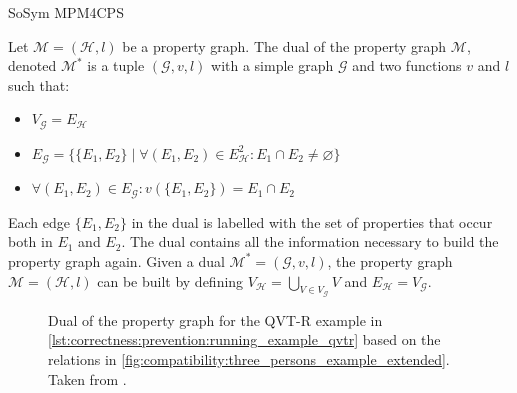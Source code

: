 \begin{copiedFrom}{SoSym MPM4CPS}
\begin{definition}
Let $\mathcal{M} = (\mathcal{H}, l)$ be a property graph. The dual of the property graph $\mathcal{M}$, denoted $\mathcal{M^{*}}$ is a tuple $(\mathcal{G}, v, l)$ with a simple graph $\mathcal{G}$ and two functions $v$ and $l$ such that:
    \begin{itemize}
        \item $V_{\mathcal{G}} = E_{\mathcal{H}}$
        \item $E_{\mathcal{G}} = \{\{E_1, E_2\} \mid \forall (E_1, E_2) \in E_{\mathcal{H}}^2 : E_1 \cap E_2 \neq \varnothing\}$
        \item $\forall (E_1, E_2) \in E_{\mathcal{G}} : v(\{E_1, E_2\}) = E_1 \cap E_2$
    \end{itemize}
\end{definition}

Each edge $\{E_1, E_2\}$ in the dual is labelled with the set of properties that occur both in $E_1$ and $E_2$. The dual contains all the information necessary to build the property graph again. Given a dual $\mathcal{M^{*}} = (\mathcal{G}, v, l)$, the property graph $\mathcal{M} = (\mathcal{H}, l)$ can be built by defining $V_{\mathcal{H}} = \bigcup_{V \in V_{\mathcal{G}}} V$ and $E_{\mathcal{H}} = V_{\mathcal{G}}$. 

\begin{figure}
    \centering
    \resizebox{0.8\linewidth}{!}{}
    \resizebox{\linewidth}{!}{}
    \caption[Dual of the property graph for the running example]{Dual of the property graph for the QVT-R example in \autoref{lst:correctness:prevention:running_example_qvtr} based on the relations in \autoref{fig:compatibility:three_persons_example_extended}. Taken from .}
    \label{fig:correctness:prevention:dual_propertygraph_re}
\end{figure}


\end{copiedFrom}
